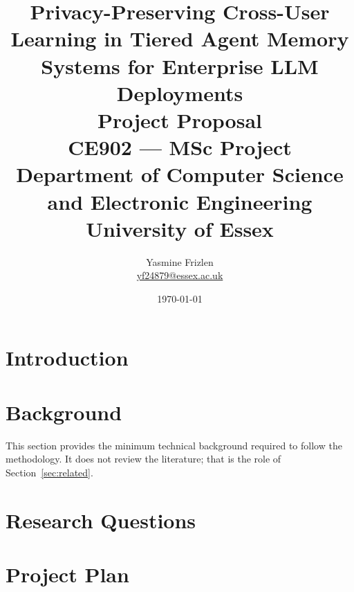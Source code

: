 \documentclass[12pt, a4paper]{article}
\title{
    \vspace{-1cm}
    \Large\textbf{Privacy-Preserving Cross-User Learning in Tiered Agent
    Memory Systems for Enterprise LLM Deployments} \\[0.5em]
    \large Project Proposal \\[0.5em]
    \normalsize CE902 --- MSc Project \\
    Department of Computer Science and Electronic Engineering \\
    University of Essex
}
\author{
    Yasmine Frizlen \\
    \small\href{mailto:yf24879@essex.ac.uk}{yf24879@essex.ac.uk}
}
\date{\today}
\begin{document}
\maketitle
\thispagestyle{empty}

\begin{abstract}
\noindent
%
% 
\end{abstract}

\vspace{0.5em}


\newpage
\tableofcontents
\newpage

\section{Introduction}


\section{Background}
\label{sec:background}

This section provides the minimum technical background required to follow the
methodology. It does not review the literature; that is the role of
Section~\ref{sec:related}.


\section{Research Questions}
\label{sec:rq}


\section{Project Plan}
\label{sec:plan}
\end{document}
